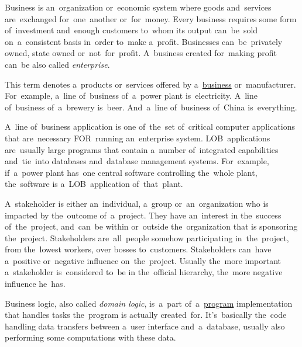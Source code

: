 \label{business}
Business is an~organization or~economic system where goods and~services are~exchanged for~one~another or~for~money. Every business requires some form of~investment and~enough customers to~whom its output can~be~sold on~a~consistent basis in~order to~make a~profit. Businesses can~be~privately owned, state owned or~not~for~profit. A~business created for~making profit can~be also called \textit{enterprise}.

This term denotes a~products or~services offered by a~\hyperref[business]{business} or~manufacturer. For~example, a~line of~business of~a~power plant is~electricity. A~line of~business of~a~brewery is~beer. And~a~line of~business of~China is~everything.

A~line of~business application is one of~the~set of~critical computer applications that are~necessary FOR~running an~enterprise system. LOB~applications are~usually large programs that contain a~number of~integrated capabilities and~tie~into databases and~database management systems. For~example, if~a~power plant has~one central software controlling the~whole plant, the~software is a~LOB~application of~that~plant.

A~stakeholder is either an~individual, a~group or~an~organization who is impacted by the~outcome of~a~project. They have an~interest in the~success of~the~project, and~can~be within or~outside the~organization that is sponsoring the~project. Stakeholders are~all~people somehow participating in~the~project, from the~lowest workers, over bosses to~customers. Stakeholders can~have a~positive or~negative influence on~the~project. Usually the~more important a~stakeholder is~considered to~be in the~official hierarchy, the~more negative influence he~has.
\newpage

\label{businesslogic}
Business logic, also called \textit{domain logic}, is~a~part of~a~\hyperref[applicationprocessprogramservicethread]{program} implementation that handles tasks the~program is actually created~for. It's~basically the~code handling data transfers between a~user interface and~a~database, usually also performing some computations with these data.

